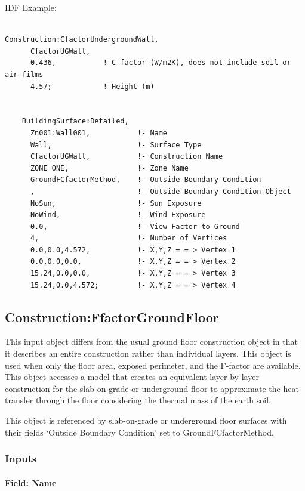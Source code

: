 IDF Example:

\begin{lstlisting}

Construction:CfactorUndergroundWall,
      CfactorUGWall,
      0.436,           ! C-factor (W/m2K), does not include soil or air films
      4.57;            ! Height (m)


    BuildingSurface:Detailed,
      Zn001:Wall001,           !- Name
      Wall,                    !- Surface Type
      CfactorUGWall,           !- Construction Name
      ZONE ONE,                !- Zone Name
      GroundFCfactorMethod,    !- Outside Boundary Condition
      ,                        !- Outside Boundary Condition Object
      NoSun,                   !- Sun Exposure
      NoWind,                  !- Wind Exposure
      0.0,                     !- View Factor to Ground
      4,                       !- Number of Vertices
      0.0,0.0,4.572,           !- X,Y,Z = = > Vertex 1
      0.0,0.0,0.0,             !- X,Y,Z = = > Vertex 2
      15.24,0.0,0.0,           !- X,Y,Z = = > Vertex 3
      15.24,0.0,4.572;         !- X,Y,Z = = > Vertex 4
\end{lstlisting}

\subsection{Construction:FfactorGroundFloor}\label{constructionffactorgroundfloor}

This input object differs from the usual ground floor construction object in that it describes an entire construction rather than individual layers. This object is used when only the floor area, exposed perimeter, and the F-factor are available.~ This object accesses a model that creates an equivalent layer-by-layer construction for the slab-on-grade or underground floor to approximate the heat transfer through the floor considering the thermal mass of the earth soil.

This object is referenced by slab-on-grade or underground floor surfaces with their fields `Outside Boundary Condition' set to GroundFCfactorMethod.

\subsubsection{Inputs}\label{inputs-37}

\paragraph{Field: Name}\label{field-name-30-000}

